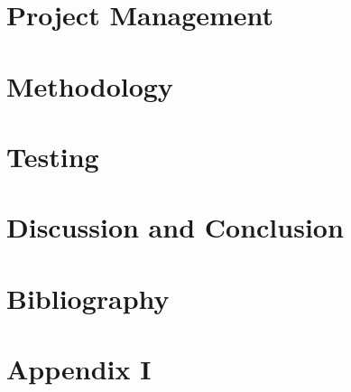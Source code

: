 \documentclass{report}
\begin{document}
\chapter{Project Management}

\chapter{Methodology}
\chapter{Testing}
\chapter{Discussion and Conclusion}
\chapter{Bibliography}
\appendix
\chapter{Appendix I}
\end{document}
